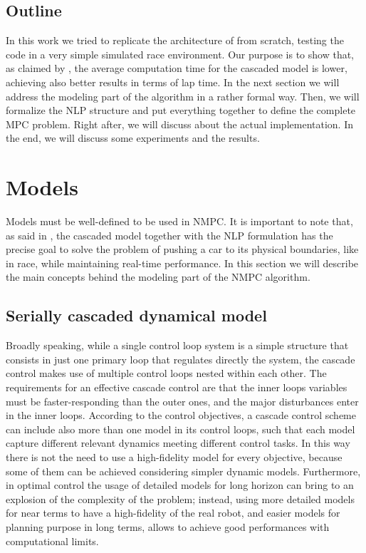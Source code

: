 \documentclass[a4paper, onecolumn, 12pt]{article}
\begin{document}
\subsection*{Outline}
In this work we tried to replicate the architecture of \cite{paper} from scratch,
testing the code in a very simple simulated race environment. Our purpose is to
show that, as claimed by \cite{paper}, the average computation time for the
cascaded model is lower, achieving also better results in terms of lap time.
In the next section we will address the modeling part of the algorithm in a
rather formal way. Then, we will formalize the NLP structure and put everything
together to define the complete MPC problem. Right after, we will discuss about
the actual implementation. In the end, we will discuss some experiments and the
results.


\section{Models}
Models must be well-defined to be used in NMPC. It is important to note that, as
said in \cite{paper}, the cascaded model together with the NLP formulation has
the precise goal to solve the problem of pushing a car to its physical
boundaries, like in race, while maintaining real-time performance. In this
section we will describe the main concepts behind the modeling part of the NMPC
algorithm. 

\subsection{Serially cascaded dynamical model}
Broadly speaking, while a single control loop system is a simple structure that
consists in just one primary loop that regulates directly the system, the
cascade control makes use of multiple control loops nested within each other.
The requirements for an effective cascade control are that the inner loops
variables must be faster-responding than the outer ones, and the major
disturbances enter in the inner loops. 
According to the control objectives, a cascade control scheme can include also 
more than one model in its control loops, such that each model capture different
relevant dynamics meeting different control tasks. In this way there is not the 
need to use a high-fidelity model for every objective, because some of them can 
be achieved considering simpler dynamic models. Furthermore, in optimal control
the usage of detailed models for long horizon can bring to an explosion of the 
complexity of the problem; instead, using more detailed models for near terms 
to have a high-fidelity of the real robot, and easier models for planning purpose
in long terms, allows to achieve good performances with computational limits.
\end{document}
